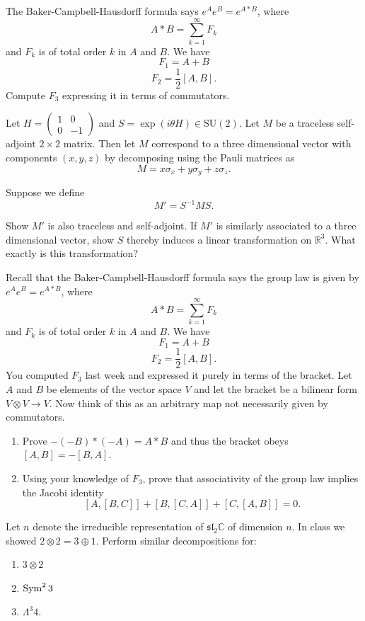   \begin{exercise} 
    The Baker-Campbell-Hausdorff formula says $e^A e^B = e^{A*B}$, where
    \[A * B = \sum_{k=1}^{\infty} F_k\]
    and $F_k$ is of total order $k$ in $A$ and $B$. We have
    \[F_1 = A+B\]
    \[F_2 = \frac{1}{2}[A,B].\]
    Compute $F_3$ expressing it in terms of commutators.
  \end{exercise}

  \begin{exercise} 
    Let $H = \begin{pmatrix} 1 & 0 \\ 0 & -1 \end{pmatrix}$ and $S = \exp(i\theta H) \in \text{SU}(2)$. Let $M$ be a traceless self-adjoint $2 \times 2$ matrix. Then let $M$ correspond to a three dimensional vector with components $(x, y, z)$ by decomposing using the Pauli matrices as
    \[M = x\sigma_x + y\sigma_y + z\sigma_z.\]
    
    Suppose we define
    \[M' = S^{-1}MS.\]
    
    Show $M'$ is also traceless and self-adjoint. If $M'$ is similarly associated to a three dimensional vector, show $S$ thereby induces a linear transformation on $\mathbb{R}^3$. What exactly is this transformation?
  \end{exercise}

  \begin{exercise} 
    Recall that the Baker-Campbell-Hausdorff formula says the group law is given by $e^A e^B = e^{A*B}$, where
    \[A*B = \sum_{k=1}^{\infty} F_k\]
    and $F_k$ is of total order $k$ in $A$ and $B$. We have
    \[F_1 = A+B\]
    \[F_2 = \frac{1}{2}[A,B].\]
    You computed $F_3$ last week and expressed it purely in terms of the bracket. Let $A$ and $B$ be elements of the vector space $V$ and let the bracket be a bilinear form $V \otimes V \to V$. Now think of this as an arbitrary map not necessarily given by commutators.
    \begin{enumerate}
      \item Prove $-(-B)*(-A) = A*B$ and thus the bracket obeys $[A,B] = -[B,A]$.
      \item Using your knowledge of $F_3$, prove that associativity of the group law implies the Jacobi identity
      \[[A,[B,C]]+[B,[C,A]]+[C,[A,B]]=0.\]
    \end{enumerate}
  \end{exercise}

  \begin{exercise} 
    Let $n$ denote the irreducible representation of $\mathfrak{sl}_2\mathbb{C}$ of dimension $n$. In class we showed $2 \otimes 2 = 3 \oplus 1$. Perform similar decompositions for:
    \begin{enumerate}
      \item $3 \otimes 2$ 
      \item $\operatorname{Sym}^2 3$ 
      \item $\Lambda^3 4$. 
    \end{enumerate}
  \end{exercise}


